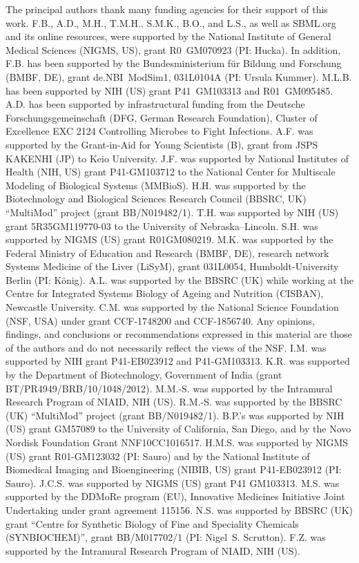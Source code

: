 \documentclass{sbml-paper}
\begin{document}
The principal authors thank many funding agencies for their support of this work.  F.B., A.D., M.H., T.M.H., S.M.K., B.O., and L.S., as well as SBML.org and its online resources, were supported by the National Institute of General Medical Sciences (NIGMS, US), grant \No R0~GM070923 (PI: Hucka).  In addition, F.B. has been supported by the Bundesministerium f\"{u}r Bildung und Forschung (BMBF, DE), grant \No de.NBI~ModSim1, 031L0104A (PI: Ursula Kummer).  M.L.B. has been supported by NIH (US) grant \No P41~GM103313 and R01~GM095485.  A.D. has been supported by infrastructural funding from the Deutsche Forschungsgemeinschaft (DFG, German Research Foundation), Cluster of Excellence EXC 2124 Controlling Microbes to Fight Infections.  A.F. was supported by the Grant-in-Aid for Young Scientists (B), grant  from JSPS KAKENHI (JP) to Keio University.  J.F. was supported by National Institutes of Health (NIH, US) grant \No P41-GM103712 to the National Center for Multiscale Modeling of Biological Systems (MMBioS).  H.H. was supported by the Biotechnology and Biological Sciences Research Council (BBSRC, UK) ``MultiMod'' project (grant \No BB/N019482/1).  T.H. was supported by NIH (US) grant \No 5R35GM119770-03 to the University of Nebraska--Lincoln.  S.H. was supported by NIGMS (US) grant \No R01GM080219.  M.K. was supported by the Federal Ministry of Education and Research (BMBF, DE), research network Systems Medicine of the Liver (LiSyM), grant \No 031L0054, Humboldt-University Berlin (PI: K\"{o}nig).  A.L. was supported by the BBSRC (UK) while working at the Centre for Integrated Systems Biology of Ageing and Nutrition (CISBAN), Newcastle University.  C.M. was supported by the National Science Foundation (NSF, USA) under grant \No CCF-1748200 and CCF-1856740.  Any opinions, findings, and conclusions or recommendations expressed in this material are those of the authors and do not necessarily reflect the views of the NSF.  I.M. was supported by NIH grant \No P41-EB023912 and P41-GM103313.  K.R. was supported by the Department of Biotechnology, Government of India (grant \No BT/PR4949/BRB/10/1048/2012).  M.M.-S. was supported by the Intramural Research Program of NIAID, NIH (US).  R.M.-S. was supported by the BBSRC (UK) ``MultiMod'' project (grant \No BB/N019482/1).  B.P.'s was supported by NIH (US) grant \No GM57089 to the University of California, San Diego, and by the Novo Nordisk Foundation Grant \No NNF10CC1016517.  H.M.S. was supported by NIGMS (US) grant \No R01-GM123032 (PI: Sauro) and by the National Institute of Biomedical Imaging and Bioengineering (NIBIB, US) grant \No P41-EB023912 (PI: Sauro).  J.C.S. was supported by NIGMS (US) grant P41 GM103313.  M.S. was supported by the DDMoRe program (EU), Innovative Medicines Initiative Joint Undertaking under grant agreement 115156.  N.S. was supported by BBSRC (UK) grant ``Centre for Synthetic Biology of Fine and Speciality Chemicals (SYNBIOCHEM)'', grant \No BB/M017702/1 (PI: Nigel~S. Scrutton).  F.Z. was supported by the Intramural Research Program of NIAID, NIH (US).
\end{document}
